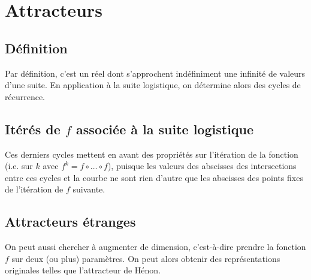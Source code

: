 %
%

\section{Attracteurs}
\subsection{Définition}
Par définition, c'est un réel dont s'approchent indéfiniment
une infinité de valeurs d'une suite. En application à la suite logistique,
on détermine alors des cycles de récurrence.
\subsection{Itérés de $ f $ associée à la suite logistique}
Ces derniers cycles mettent en avant des propriétés sur l'itération de
la fonction (i.e. sur $ k $ avec $ f^k = f \circ \ldots \circ f $),
puisque les valeurs des abscisses des intersections entre ces
cycles et la courbe ne sont rien d'autre que les abscisses des points fixes
de l'itération de $f$ suivante.
\subsection{Attracteurs étranges}
On peut aussi chercher à augmenter de dimension, c'est-à-dire
prendre la fonction $ f $ sur deux (ou plus) paramètres. On peut
alors obtenir des représentations originales telles que l'attracteur
de Hénon.

